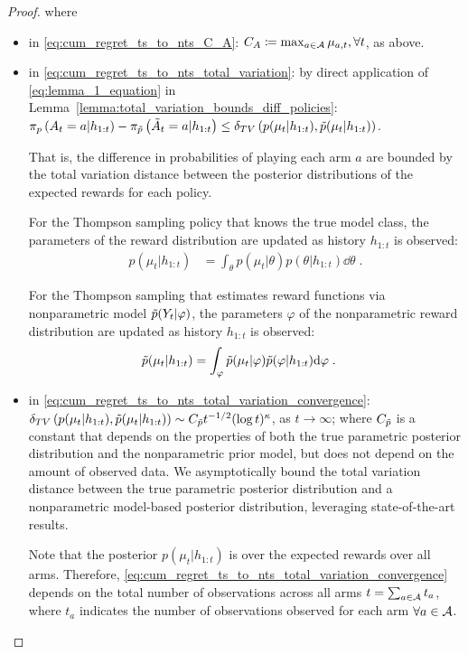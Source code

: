 \begin{proof}
where

\begin{itemize}
	\item in \autoref{eq:cum_regret_ts_to_nts_C_A}: $C_A \coloneqq \max_{a \in \mathcal{A}} \mu_{a,t}, \forall t$, as above.

	\item in \autoref{eq:cum_regret_ts_to_nts_total_variation}: by direct application of \autoref{eq:lemma_1_equation} in Lemma~\ref{lemma:total_variation_bounds_diff_policies}:
	$\pi_{p}\left( A_t=a|h_{1:t} \right)-\pi_{\tilde{p}}\left( \tilde{A}_t=a|h_{1:t} \right) \leq \delta_{TV} \left(p(\mu_t|h_{1:t}),\tilde{p}(\mu_t|h_{1:t})\right)$.
	
	That is, the difference in probabilities of playing each arm $a$ are bounded by the total variation distance between the posterior distributions of the expected rewards for each policy.

	For the Thompson sampling policy that knows the true model class, the parameters of the reward distribution are updated as history $h_{1:t}$ is observed:
	\begin{align}
	p(\mu_t|h_{1:t}) &=\int_{\theta} p(\mu_t|\theta)p(\theta|h_{1:t})\dd\theta \nonumber \;.
	\end{align}
	
	For the Thompson sampling that estimates reward functions via nonparametric model $\tilde{p}(Y_t|\varphi)$, the parameters $\varphi$ of the nonparametric reward distribution are updated as history $h_{1:t}$ is observed:
	\begin{align}
	\tilde{p}(\mu_t|h_{1:t}) &=\int_{\varphi} \tilde{p}(\mu_t|\varphi)\tilde{p}(\varphi|h_{1:t})\mathrm{d} \varphi \nonumber \;.
	\end{align}

	\item in \autoref{eq:cum_regret_ts_to_nts_total_variation_convergence}: $\delta_{TV} \left(p(\mu_t|h_{1:t}),\tilde{p}(\mu_t|h_{1:t})\right) \sim C_{\tilde{p}} t^{-1/2}(\log t)^\kappa$, as $t\rightarrow \infty$; 
	where $C_{\tilde{p}}$ is a constant that depends on the properties of both the true parametric posterior distribution and the nonparametric prior model, but does not depend on the amount of observed data. 
	We asymptotically bound the total variation distance between the true parametric posterior distribution and a nonparametric model-based posterior distribution, leveraging state-of-the-art results.
	
	Note that the posterior $p(\mu_t|h_{1:t})$ is over the expected rewards over all arms. Therefore, \autoref{eq:cum_regret_ts_to_nts_total_variation_convergence} depends on the total number of observations across all arms $t=\sum_{a \in \mathcal{A}} t_a$, where $t_a$ indicates the number of observations observed for each arm $\forall a\in \mathcal{A}$.
	

\end{itemize}
\end{proof}
